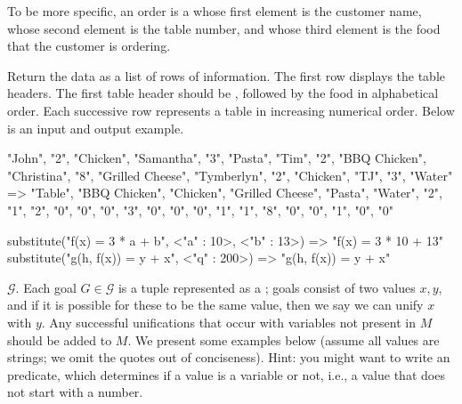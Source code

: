 To be more specific, an order is a  whose first element is the customer name, whose second element is the table number, and whose third element is the food that the customer is ordering. 

Return the data as a list of rows of information. The first row displays the table headers. The first table header should be , followed by the food in alphabetical order. Each successive row represents a table in increasing numerical order. Below is an input and output example.

\begin{verbnobox}[\small]
{{"John", "2", "Chicken"}, {"Samantha", "3", "Pasta"}, 
 {"Tim", "2", "BBQ Chicken"}, {"Christina", "8", "Grilled Cheese"}, 
 {"Tymberlyn", "2", "Chicken"}, {"TJ", "3", "Water"}}
=> 
{{"Table", "BBQ Chicken", "Chicken", "Grilled Cheese", "Pasta", "Water"},
 {"2", "1", "2", "0", "0", "0"},
 {"3", "0", "0", "0", "1", "1"},
 {"8", "0", "0", "1", "0", "0"}}
\end{verbnobox}


\begin{verbnobox}[\small]
substitute("f(x) = 3 * a + b", {<"a" : 10>, <"b" : 13>})
           => "f(x) = 3 * 10 + 13"
substitute("g(h, f(x)) = y + x", {<"q" : 200>})          
           => "g(h, f(x)) = y + x" 
\end{verbnobox}

 $\mathcal{G}$. Each goal $G \in \mathcal{G}$ is a tuple represented as a ; goals consist of two values $x, y$, and if it is possible for these to be the same value, then we say we can unify $x$ with $y$. Any successful unifications that occur with variables not present in $M$ should be added to $M$. We present some examples below (assume all values are strings; we omit the quotes out of conciseness). Hint: you might want to write an  predicate, which determines if a value is a variable or not, i.e., a value that does not start with a number.

